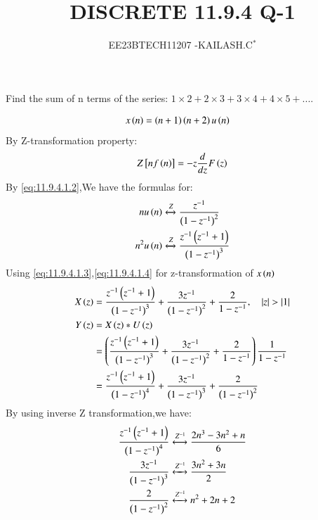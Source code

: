 \documentclass[journal,12pt,twocolumn]{IEEEtran}
\theoremstyle{remark}
\begin{document}

\vspace{3cm}

\title{DISCRETE 11.9.4 Q-1}
\author{EE23BTECH11207 -KAILASH.C$^{*}$%
}
\maketitle
\newpage
\bigskip

\renewcommand{\thefigure}{\theenumi}
\renewcommand{\thetable}{\theenumi}


Find the sum of n terms of the series:
$1\times2+2\times3+3\times4+4\times5+....$\\
\solution
\fi

\begin{align}
 x\left(n\right)&=\left(n+1\right)\left(n+2\right)u\left(n\right)\label{eq:11.9.4.1.1}
\end{align}
By Z-transformation property:
\begin{align}
Z{}\left[nf\left(n\right)\right]=-z\frac{d}{dz}F\left(z\right)\label{eq:11.9.4.1.2}
\end{align}
By \eqref{eq:11.9.4.1.2},We have the formulas for:
\begin{align}
nu\left(n\right)&\xleftrightarrow[]{Z} \frac{z^{-1}}{\left(1-z^{-1}\right)^2}\label{eq:11.9.4.1.3}\\
n^2u\left(n\right)&\xleftrightarrow[]{Z}\frac{z^{-1}\left(z^{-1}+1\right)}{\left(1-z^{-1}\right)^3}\label{eq:11.9.4.1.4}
\end{align}
Using \eqref{eq:11.9.4.1.3},\eqref{eq:11.9.4.1.4} for z-transformation of $x\left(n\right)$
\begin{align}
    X\left(z\right)&=\frac{z^{-1}\left(z^{-1}+1\right)}{\left(1-z^{-1}\right)^3}+\frac{3z^{-1}}{\left(1-z^{-1}\right)^2}+\frac{2}{1-z^{-1}},\quad\left\vert z\right\vert>\left\vert1\right\vert\label{eq:11.9.4.1.5}\\
    Y\left(z\right)&=X\left(z\right)*U\left(z\right)\label{eq:11.9.4.1.6}\\
   &=\left(\frac{z^{-1}\left(z^{-1}+1\right)}{\left(1-z^{-1}\right)^3}+\frac{3z^{-1}}{\left(1-z^{-1}\right)^2}+\frac{2}{1-z^{-1}}\right)\frac{1}{1-z^{-1}}\label{eq:11.9.4.1.7}\\
   &=\frac{z^{-1}\left(z^{-1}+1\right)}{\left(1-z^{-1}\right)^4}+\frac{3z^{-1}}{\left(1-z^{-1}\right)^3}+\frac{2}{\left(1-z^{-1}\right)^2}\label{eq:11.9.4.1.8}
\end{align}
By using inverse Z transformation,we have:
\begin{align}
    \frac{z^{-1}\left(z^{-1}+1\right)}{\left(1-z^{-1}\right)^4}&\xleftrightarrow[]{Z^{-1}} \frac{2n^3-3n^2+n}{6}\label{eq:11.9.4.1.9}\\
    \frac{3z^{-1}}{\left(1-z^{-1}\right)^3}&\xleftrightarrow[]{Z^{-1}} \frac{3n^2+3n}{2}\label{eq:11.9.4.1.10}\\
    \frac{2}{\left(1-z^{-1}\right)^2}&\xleftrightarrow[]{Z^{-1}} n^2+2n+2\label{eq:11.9.4.1.11}
\end{align}
\end{document}
